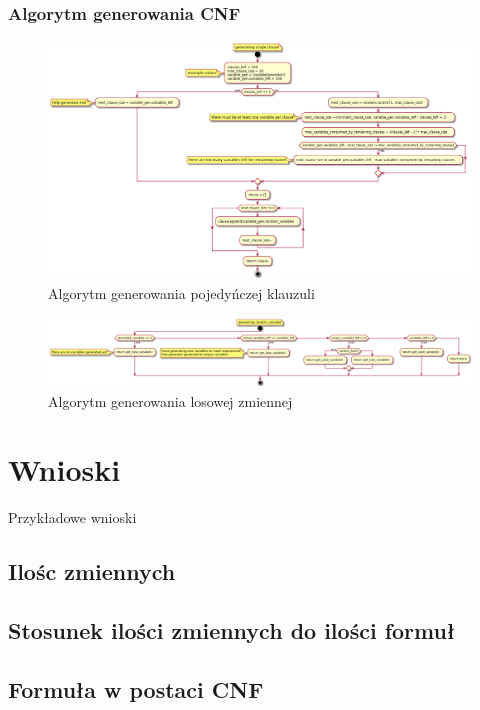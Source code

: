 \documentclass[a4paper,12pt]{article}
\begin{document}
\subsubsection{Algorytm generowania CNF}

\begin{figure}[H]
  \centering
  \includegraphics[width=\textwidth]{lfg/clause_generator.png}
  \caption{Algorytm generowania pojedyńczej klauzuli}
\end{figure}

\begin{figure}[H]
  \centering
  \includegraphics[width=\textwidth]{lfg/variable_generator.png}
  \caption{Algorytm generowania losowej zmiennej}
\end{figure}

\section{Wnioski}

Przykładowe wnioski

\subsection{Ilośc zmiennych}

\subsection{Stosunek ilości zmiennych do ilości formuł}

\subsection{Formuła w postaci CNF}

\printglossary[type=\acronymtype]
\printglossary
\end{document}
